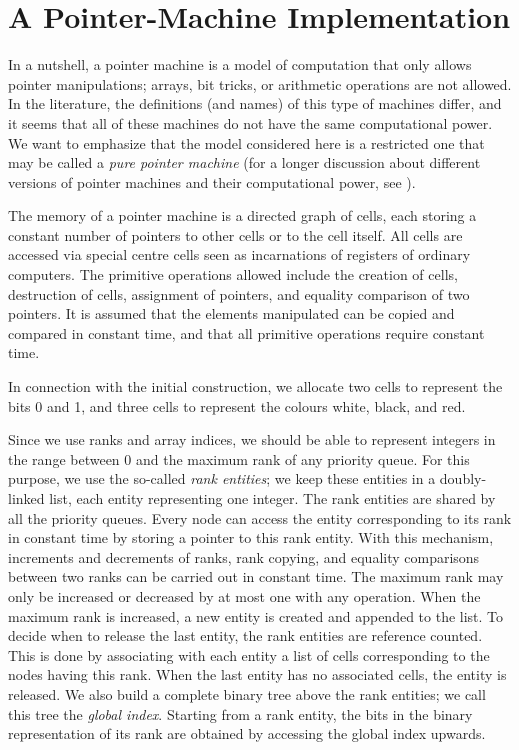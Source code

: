 \documentclass{llncs}
\begin{document}
\section{A Pointer-Machine Implementation}

In a nutshell, a pointer machine is a model of computation that only
allows pointer manipulations; arrays, bit tricks, or arithmetic
operations are not allowed.  In the literature, the definitions (and
names) of this type of machines differ, and it seems that all of these
machines do not have the same computational power. We want to
emphasize that the model considered here is a restricted one that may
be called a \emph{pure pointer machine} (for a longer discussion about
different versions of pointer machines and their computational power,
see \cite{Ben95}).

The memory of a pointer machine is a directed graph of cells, each
storing a constant number of pointers to other cells or to the cell
itself. All cells are accessed via special centre cells seen as
incarnations of registers of ordinary computers. The primitive
operations allowed include the creation of cells, destruction of
cells, assignment of pointers, and equality comparison of two
pointers. It is assumed that the elements manipulated can be copied
and compared in constant time, and that all primitive operations
require constant time.

In connection with the initial construction, we allocate two cells to represent the bits 0 and 1,
and three cells to represent the colours white, black, and red.  

Since we use ranks and array indices, we should be able to represent integers in
the range between 0 and the maximum rank of any priority queue.  
For this purpose, we use the so-called \emph{rank entities}; 
we keep these entities in a doubly-linked list, each entity representing one integer. 
The rank entities are shared by all the priority queues.
Every node can access the entity corresponding to its rank in
constant time by storing a pointer to this rank entity. 
With this mechanism, increments and decrements of ranks, rank copying, and equality
comparisons between two ranks can be carried out in constant time.
The maximum rank may only be increased or decreased by at most one with any operation. 
When the maximum rank is increased, a new entity is created and appended to the list. 
To decide when to release the last entity, the rank
entities are reference counted. This is done by associating with each
entity a list of cells corresponding to the nodes having this rank. 
When the last entity has no associated cells, the entity is released.
We also build a complete binary tree above the rank entities; we call
this tree the \emph{global index}.  Starting from a rank entity, the
bits in the binary representation of its rank are
obtained by accessing the global index upwards.
\end{document}
